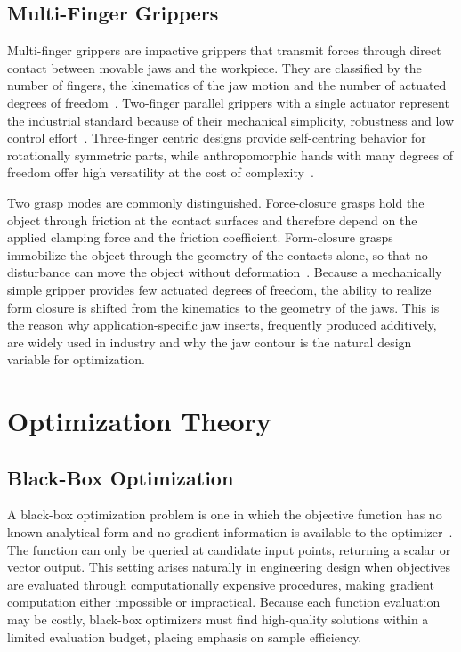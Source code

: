 \subsection{Multi-Finger Grippers}
\label{subsubsec:multi_finger_grippers}

Multi-finger grippers are impactive grippers that transmit forces through direct contact between movable jaws and the workpiece. They are classified
by the number of fingers, the kinematics of the jaw motion and the number of actuated degrees of freedom~\cite{Khalid2025Design}. Two-finger parallel
grippers with a single actuator represent the industrial standard because of their mechanical simplicity, robustness and low control
effort~\cite{Ciocarlie2014The}. Three-finger centric designs provide self-centring behavior for rotationally symmetric parts, while anthropomorphic
hands with many degrees of freedom offer high versatility at the cost of complexity~\cite{Simionescu2008Mathematical,Backus2016An}.

Two grasp modes are commonly distinguished. Force-closure grasps hold the object through friction at the contact surfaces and therefore depend on the
applied clamping force and the friction coefficient. Form-closure grasps immobilize the object through the geometry of the contacts alone, so that no
disturbance can move the object without deformation~\cite{Bicchi1995On}. Because a mechanically simple gripper provides few actuated degrees of
freedom, the ability to realize form closure is shifted from the kinematics to the geometry of the jaws. This is the reason why application-specific
jaw inserts, frequently produced additively, are widely used in industry and why the jaw contour is the natural design variable for
optimization.~\cite{Gebauer2024Uncertainty-integrating}


\section{Optimization Theory}
\label{subsec:optimization_theory}

\subsection{Black-Box Optimization}
\label{subsubsec:black_box_optimization}

A black-box optimization problem is one in which the objective function has no known analytical form and no gradient information is available to the
optimizer~\cite{Audet2017Derivative-Free}. The function can only be queried at candidate input points, returning a scalar or vector output. This
setting arises naturally in engineering design when objectives are evaluated through computationally expensive procedures, making gradient computation
either impossible or impractical. Because each function evaluation may be costly, black-box optimizers must find high-quality solutions within a
limited evaluation budget, placing emphasis on sample efficiency.~\cite{xu2023constrained,Paulson2021COBALT}

